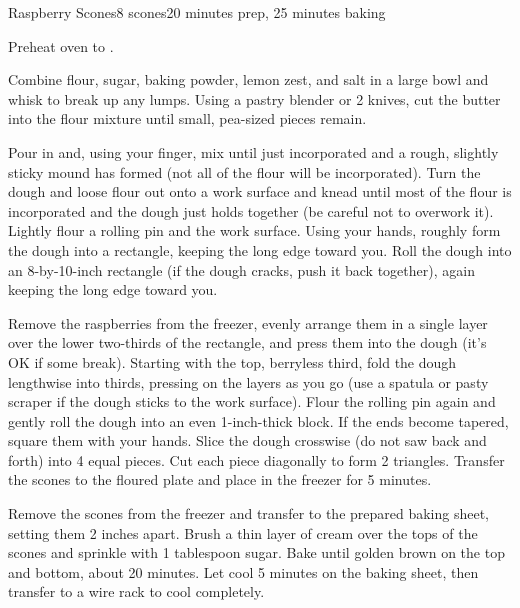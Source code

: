 \documentclass[../Cookbook.tex]{subfiles}
\begin{document}
\begin{recipe}{Raspberry Scones}{8 scones}{20 minutes prep, 25 minutes baking}

	Preheat oven to .


Combine flour, sugar, baking powder, lemon zest, and salt in a large bowl and whisk to break up any lumps. Using a pastry blender or 2 knives, cut the butter into the flour mixture until small, pea-sized pieces remain.

Pour in and, using your finger, mix until just incorporated and a rough, slightly sticky mound has formed (not all of the flour will be incorporated). Turn the dough and loose flour out onto a work surface and knead until most of the flour is incorporated and the dough just holds together (be careful not to overwork it). Lightly flour a rolling pin and the work surface. Using your hands, roughly form the dough into a rectangle, keeping the long edge toward you. Roll the dough into an 8-by-10-inch rectangle (if the dough cracks, push it back together), again keeping the long edge toward you.

Remove the raspberries from the freezer, evenly arrange them in a single layer over the lower two-thirds of the rectangle, and press them into the dough (it's OK if some break).
Starting with the top, berryless third, fold the dough lengthwise into thirds, pressing on the layers as you go (use a spatula or pasty scraper if the dough sticks to the work surface).
Flour the rolling pin again and gently roll the dough into an even 1-inch-thick block. If the ends become tapered, square them with your hands. Slice the dough crosswise (do not saw back and forth) into 4 equal pieces. Cut each piece diagonally to form 2 triangles.
Transfer the scones to the floured plate and place in the freezer for 5 minutes.

\newstep
Remove the scones from the freezer and transfer to the prepared baking sheet, setting them 2 inches apart. Brush a thin layer of cream over the tops of the scones and sprinkle with 1 tablespoon sugar. Bake until golden brown on the top and bottom, about 20 minutes. Let cool 5 minutes on the baking sheet, then transfer to a wire rack to cool completely.

\end{recipe}
\end{document}
